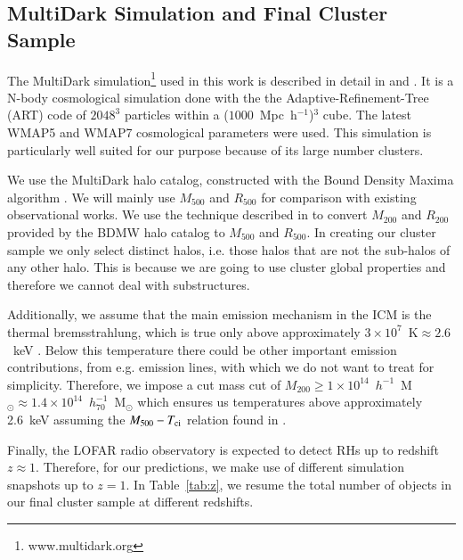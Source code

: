 \documentclass[traditabstract]{aa}
\newcommand{\rmn}{\mathrm}
\begin{document}
\subsection{MultiDark Simulation and Final Cluster Sample}
\label{sec:2.1}
The MultiDark simulation\footnote[3]{www.multidark.org} used in this work is described in 
detail in \cite{2011arXiv1104.5130P} and \cite{2011arXiv1109.0003R}.  It is a N-body cosmological simulation 
done with the the Adaptive-Refinement-Tree (ART) code \citep{1997ApJS..111...73K} of $2048^3$ particles within
a ($1000$~Mpc~h$^{-1}$)$^3$ cube. The latest WMAP5 and WMAP7 cosmological parameters 
were used. This simulation is particularly  well suited for our purpose because of its large number clusters. 
 
We use the MultiDark halo catalog, constructed with the Bound Density Maxima algorithm \citep{1997astro.ph.12217K}.
We will mainly use $M_{500}$ and $R_{500}$ for comparison with existing observational works. 
We use the technique described in \cite{2003ApJ...584..702H} to convert $M_{200}$ and $R_{200}$ provided by the BDMW halo catalog to $M_{500}$ and $R_{500}$.
In creating our cluster sample we only select distinct halos, i.e. those halos that are not the sub-halos
of any other halo. This is because we are going to use cluster global properties and therefore we cannot
deal with substructures.

Additionally, we assume that the main emission mechanism in the ICM is the thermal bremsstrahlung, which is true only above approximately $3\times10^{7}$~$\rmn{K}\approx2.6$~keV \citep{1988xrec.book.....S}. Below this temperature there could be other important emission contributions, from e.g. emission lines, with which we do not want to treat for simplicity. Therefore, we impose a cut mass cut of $M_{200}\geq1\times10^{14}$~$h^{-1}$~M$_{\odot}\approx1.4\times10^{14}$~$h_{70}^{-1}$~M$_{\odot}$ which ensures us temperatures above approximately 2.6~keV assuming the $M_{500} - T_{\rm{ci}}$ relation found in \cite{2010MNRAS.406.1773M}.

Finally, the LOFAR radio observatory is expected to detect RHs up to redshift $z \approx 1$. Therefore, for our predictions, we make use of different simulation snapshots up
to $z=1$. In Table~\ref{tab:z}, we resume the total number of objects in our final cluster sample at different redshifts.
\end{document}

